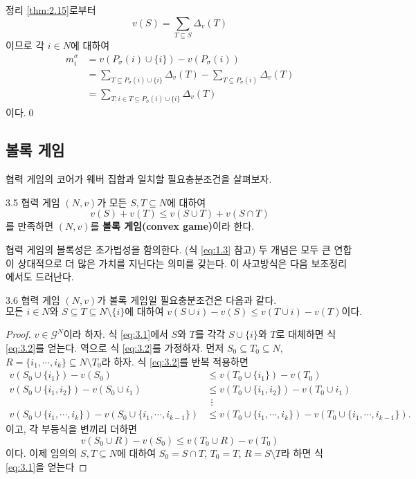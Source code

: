 \documentclass{article}
\numberwithin{equation}{section}
\begin{document}
\begin{sol}
	정리 \ref{thm:2.15}로부터
	\[
		v(S)=\sum_{T\subseteq S}\Delta_v(T)
	\]
	이므로 각 $i\in N$에 대하여
	\[
		\begin{aligned}
			m^\sigma_i&=v(P_\sigma(i)\cup\{i\})-v(P_\sigma(i))\\
			&=\sum_{T\subseteq P_\sigma(i)\cup\{i\}}\Delta_v(T)-\sum_{T\subseteq P_\sigma(i)}\Delta_v(T)\\
			&=\sum_{T:i\in T\subseteq P_\sigma(i)\cup\{i\}}\Delta_v(T)
		\end{aligned}
	\]
	이다.\qed
\end{sol}

\subsection{볼록 게임}
협력 게임의 코어가 웨버 집합과 일치할 필요충분조건을 살펴보자.

\begin{dfn}{}{3.5}
	협력 게임 $(N,v)$가 모든 $S,T\subseteq N$에 대하여
	\begin{equation}
		\label{eq:3.1}
		v(S)+v(T)\leq v(S\cup T)+v(S\cap T)
	\end{equation}
	를 만족하면 $(N,v)$를 \textbf{볼록 게임(convex game)}이라 한다.
\end{dfn}

협력 게임의 볼록성은 초가법성을 함의한다. (식 \ref{eq:1.3} 참고) 두 개념은 모두 큰 연합이 상대적으로 더 많은 가치를 지닌다는 의미를 갖는다. 이 사고방식은 다음 보조정리에서도 드러난다.

\begin{lemma}{}{3.6}
	협력 게임 $(N,v)$가 볼록 게임일 필요충분조건은 다음과 같다.
	\begin{equation}
		\label{eq:3.2}
		\text{모든 }i\in N\text{와 }S\subseteq T\subseteq N\setminus\{i\}\text{에 대하여 }v(S\cup i)-v(S)\leq v(T\cup i)-v(T)\text{이다.}
	\end{equation}
\end{lemma}

\begin{proof}
	$v\in\mathcal G^N$이라 하자. 식 \ref{eq:3.1}에서 $S$와 $T$를 각각 $S\cup\{i\}$와 $T$로 대체하면 식 \ref{eq:3.2}를 얻는다. 역으로 식 \ref{eq:3.2}를 가정하자. 먼저 $S_0\subseteq T_0\subseteq N$, $R=\{i_1,\cdots,i_k\}\subseteq N\setminus T_0$라 하자. 식 \ref{eq:3.2}를 반복 적용하면
	\[
		\begin{aligned}
			v(S_0\cup \{i_1\})-v(S_0)&\leq v(T_0\cup \{i_1\})-v(T_0)\\
			v(S_0\cup\{i_1,i_2\})-v(S_0\cup i_1)&\leq v(T_0\cup\{i_1,i_2\})-v(T_0\cup i_1)\\
			&~~\vdots\\
			v(S_0\cup\{i_1,\cdots,i_k\})-v(S_0\cup\{i_1,\cdots,i_{k-1}\})&\leq v(T_0\cup\{i_1,\cdots,i_k\})-v(T_0\cup\{i_1,\cdots,i_{k-1}\}).
		\end{aligned}
	\]
	이고, 각 부등식을 변끼리 더하면
	\[
		v(S_0\cup R)-v(S_0)\leq v(T_0\cup R)-v(T_0)
	\]
	이다. 이제 임의의 $S,T\subseteq N$에 대하여 $S_0=S\cap T$, $T_0=T$, $R=S\setminus T$라 하면 식 \ref{eq:3.1}을 얻는다
\end{proof}
\end{document}

